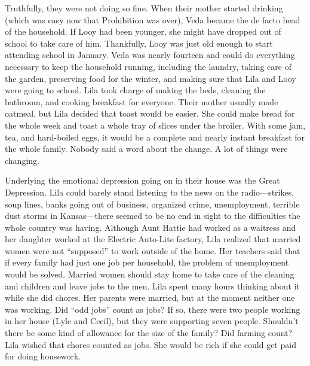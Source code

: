 \documentclass[
  letterpaper,
]{book}
\begin{document}
Truthfully, they were not doing so fine. When their mother started
drinking (which was easy now that Prohibition was over), Veda became the
de facto head of the household. If Looy had been younger, she might have
dropped out of school to take care of him. Thankfully, Looy was just old
enough to start attending school in January. Veda was nearly fourteen
and could do everything necessary to keep the household running,
including the laundry, taking care of the garden, preserving food for
the winter, and making sure that Lila and Looy were going to school.
Lila took charge of making the beds, cleaning the bathroom, and cooking
breakfast for everyone. Their mother usually made oatmeal, but Lila
decided that toast would be easier. She could make bread for the whole
week and toast a whole tray of slices under the broiler. With some jam,
tea, and hard-boiled eggs, it would be a complete and nearly instant
breakfast for the whole family. Nobody said a word about the change. A
lot of things were changing.

Underlying the emotional depression going on in their house was the
Great Depression. Lila could barely stand listening to the news on the
radio---strikes, soup lines, banks going out of business, organized
crime, unemployment, terrible dust storms in Kansas---there seemed to be
no end in sight to the difficulties the whole country was having.
Although Aunt Hattie had worked as a waitress and her daughter worked at
the Electric Auto-Lite factory, Lila realized that married women were
not ``supposed'' to work outside of the home. Her teachers said that if
every family had just one job per household, the problem of unemployment
would be solved. Married women should stay home to take care of the
cleaning and children and leave jobs to the men. Lila spent many hours
thinking about it while she did chores. Her parents were married, but at
the moment neither one was working. Did ``odd jobs'' count as jobs? If
so, there were two people working in her house (Lyle and Cecil), but
they were supporting seven people. Shouldn't there be some kind of
allowance for the size of the family? Did farming count? Lila wished
that chores counted as jobs. She would be rich if she could get paid for
doing housework.
\end{document}
